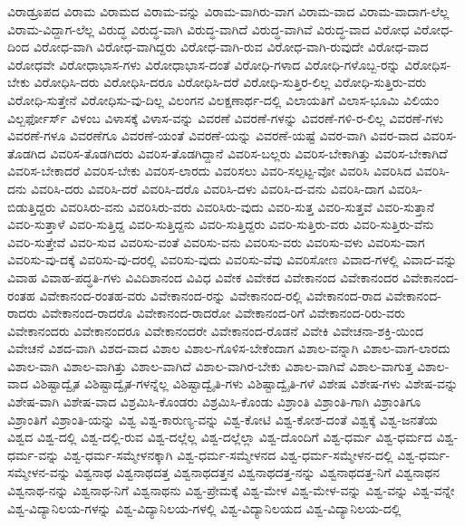 {ವಿರಾಡ್ರೂಪದ
ವಿರಾಮ
ವಿರಾಮದ
ವಿರಾಮ-ವನ್ನು
ವಿರಾಮ-ವಾಗಿರು-ವಾಗ
ವಿರಾಮ-ವಾದ
ವಿರಾಮ-ವಾದಾಗ-ಲೆಲ್ಲ
ವಿರಾಮ-ವಿದ್ದಾಗ-ಲೆಲ್ಲ
ವಿರುದ್ಧ
ವಿರುದ್ಧ-ವಾಗಿ
ವಿರುದ್ಧ-ವಾಗಿದೆ
ವಿರುದ್ಧ-ವಾಗಿವೆ
ವಿರುದ್ಧ-ವಾದ
ವಿರೋಧ
ವಿರೋಧ-ದಿಂದ
ವಿರೋಧ-ವಾಗಿ
ವಿರೋಧ-ವಾಗಿದ್ದರು
ವಿರೋಧ-ವಾಗಿ-ರುವ
ವಿರೋಧ-ವಾಗಿ-ರುವುದೇ
ವಿರೋಧ-ವಾದ
ವಿರೋಧವೇ
ವಿರೋಧಾಭಾಸ-ಗಳು
ವಿರೋಧಾಭಾಸ-ದಂತೆ
ವಿರೋಧಿ-ಗಳಾದ
ವಿರೋಧಿ-ಗಳೊಬ್ಬ-ರನ್ನು
ವಿರೋಧಿಸ-ಬೇಕು
ವಿರೋಧಿಸಿ-ದರು
ವಿರೋಧಿಸಿ-ದರೂ
ವಿರೋಧಿಸಿ-ದರೆ
ವಿರೋಧಿ-ಸುತ್ತಿರ-ಲಿಲ್ಲ
ವಿರೋಧಿ-ಸುತ್ತಿರು-ವರು
ವಿರೋಧಿ-ಸುತ್ತೇನೆ
ವಿರೋಧಿಸು-ವು-ದಿಲ್ಲ
ವಿಲಂಗನ
ವಿಲಕ್ಷಣಾರ್ಥ-ದಲ್ಲಿ
ವಿಲಾಯತಿಗೆ
ವಿಲಾಸ-ಭೂಮಿ
ವಿಲಿಯಂ
ವಿಲ್ಬರ್ಫೋರ್ಸ್
ವಿಳಂಬ
ವಿಳಾಸಕ್ಕೆ
ವಿಳಾಸ-ವನ್ನು
ವಿವರಣೆ
ವಿವರಣೆ-ಗಳನ್ನು
ವಿವರಣೆ-ಗಳಿ-ರ-ಲಿಲ್ಲ
ವಿವರಣೆ-ಗಳು
ವಿವರಣೆ-ಗಳೂ
ವಿವರಣೆಗೂ
ವಿವರಣೆ-ಯಂತೆ
ವಿವರಣೆ-ಯನ್ನು
ವಿವರಣೆ-ಯಷ್ಟೆ
ವಿವರ-ವಾಗಿ
ವಿವರ-ವಾದ
ವಿವರಿಸ-ತೊಡಗಿದ
ವಿವರಿಸ-ತೊಡಗಿದರು
ವಿವರಿಸ-ತೊಡಗಿದ್ದಾನೆ
ವಿವರಿಸ-ಬಲ್ಲರು
ವಿವರಿಸ-ಬೇಕಾಗಿತ್ತು
ವಿವರಿಸ-ಬೇಕಾಗಿದೆ
ವಿವರಿಸ-ಬೇಕಾದರೆ
ವಿವರಿಸ-ಬೇಕು
ವಿವರಿಸ-ಲಾರದು
ವಿವರಿಸಲು
ವಿವರಿ-ಸಲ್ಪಟ್ಟ-ವೋ
ವಿವರಿಸಿ
ವಿವರಿಸಿದ
ವಿವರಿಸಿ-ದನು
ವಿವರಿಸಿ-ದರು
ವಿವರಿಸಿ-ದರೆ
ವಿವರಿಸಿ-ದರೊ
ವಿವರಿಸಿ-ದಳು
ವಿವರಿಸಿ-ದ-ವನು
ವಿವರಿಸಿ-ದಾಗ
ವಿವರಿಸಿ-ಬಿಡುತ್ತಿದ್ದರು
ವಿವರಿಸಿರು-ವನು
ವಿವರಿಸಿರು-ವರು
ವಿವರಿಸಿರು-ವುದು
ವಿವರಿ-ಸುತ್ತ
ವಿವರಿ-ಸುತ್ತವೆ
ವಿವರಿ-ಸುತ್ತಾನೆ
ವಿವರಿ-ಸುತ್ತಾಳೆ
ವಿವರಿ-ಸುತ್ತಿದ್ದ
ವಿವರಿ-ಸುತ್ತಿದ್ದನು
ವಿವರಿ-ಸುತ್ತಿದ್ದರು
ವಿವರಿ-ಸುತ್ತಿರು-ವರು
ವಿವರಿ-ಸುತ್ತಿರು-ವೆನು
ವಿವರಿ-ಸುತ್ತೇವೆ
ವಿವರಿ-ಸುವ
ವಿವರಿಸು-ವಂತೆ
ವಿವರಿಸು-ವನು
ವಿವರಿಸು-ವರು
ವಿವರಿಸು-ವಳು
ವಿವರಿಸು-ವಾಗ
ವಿವರಿಸು-ವು-ದಕ್ಕೆ
ವಿವರಿಸು-ವು-ದರಲ್ಲಿ
ವಿವರಿಸು-ವುದು
ವಿವರಿಸು-ವೆವು
ವಿವರಿಸೋಣ
ವಿವಾದ-ಗಳಲ್ಲಿ
ವಿವಾದ-ವನ್ನು
ವಿವಾಹ
ವಿವಾಹ-ಪದ್ಧತಿ-ಗಳು
ವಿವಿದಿಶಾನಂದ
ವಿವಿಧ
ವಿವೇಕ
ವಿವೇಕದ
ವಿವೇಕಾನಂದ
ವಿವೇಕಾನಂದರ
ವಿವೇಕಾನಂದ-ರಂತಹ
ವಿವೇಕಾನಂದ-ರಂತಹ-ವರು
ವಿವೇಕಾನಂದ-ರನ್ನು
ವಿವೇಕಾನಂದ-ರಲ್ಲಿ
ವಿವೇಕಾನಂದ-ರಾದ
ವಿವೇಕಾನಂದ-ರಾದರು
ವಿವೇಕಾನಂದ-ರಾದರೊ
ವಿವೇಕಾನಂದ-ರಾದರೋ
ವಿವೇಕಾನಂದ-ರಿಗೆ
ವಿವೇಕಾನಂದ-ರಿರು-ವರು
ವಿವೇಕಾನಂದರು
ವಿವೇಕಾನಂದರೂ
ವಿವೇಕಾನಂದರೇ
ವಿವೇಕಾನಂದ-ರೊಡನೆ
ವಿವೇಕಿ
ವಿವೇಚನಾ-ಶಕ್ತಿ-ಯಿಂದ
ವಿವೇಚನೆ
ವಿಶದ-ವಾಗಿ
ವಿಶದ-ವಾದ
ವಿಶಾಲ
ವಿಶಾಲ-ಗೊಳಿಸ-ಬೇಕೆಂದಾಗ
ವಿಶಾಲ-ವನ್ನಾಗಿ
ವಿಶಾಲ-ವಾಗ-ಲಾರದು
ವಿಶಾಲ-ವಾಗಿ
ವಿಶಾಲ-ವಾಗಿತ್ತು
ವಿಶಾಲ-ವಾಗಿದೆ
ವಿಶಾಲ-ವಾಗಿರ-ಬೇಕು
ವಿಶಾಲ-ವಾಗಿವೆ
ವಿಶಾಲ-ವಾಗುತ್ತ
ವಿಶಾಲ-ವಾದ
ವಿಶಿಷ್ಟಾದ್ವೈತ
ವಿಶಿಷ್ಟಾದ್ವೈತ-ಗಳನ್ನೆಲ್ಲ
ವಿಶಿಷ್ಟಾದ್ವೈತಿ-ಗಳು
ವಿಶಿಷ್ಟಾದ್ವೈತಿ-ಗಳೆ
ವಿಶೇಷ
ವಿಶೇಷ-ಗಳು
ವಿಶೇಷ-ವನ್ನು
ವಿಶೇಷ-ವಾಗಿ
ವಿಶೇಷ-ವಾದ
ವಿಶ್ರಮಿಸಿ-ಕೊಂಡರು
ವಿಶ್ರಮಿಸಿ-ಕೊಂಡು
ವಿಶ್ರಾಂತಿ
ವಿಶ್ರಾಂತಿ-ಗಾಗಿ
ವಿಶ್ರಾಂತಿಗೂ
ವಿಶ್ರಾಂತಿಗೆ
ವಿಶ್ರಾಂತಿ-ಯನ್ನು
ವಿಶ್ವ
ವಿಶ್ವ-ಕಾರುಣ್ಯ-ವನ್ನು
ವಿಶ್ವ-ಕೋಟಿ
ವಿಶ್ವ-ಕೋಶ-ದಂತೆ
ವಿಶ್ವಕ್ಕೆ
ವಿಶ್ವ-ಜನತೆಯ
ವಿಶ್ವದ
ವಿಶ್ವ-ದಲ್ಲಿ
ವಿಶ್ವ-ದಲ್ಲಿ-ರುವ
ವಿಶ್ವ-ದಲ್ಲೆಲ್ಲ
ವಿಶ್ವ-ದಲ್ಲೆಲ್ಲಾ
ವಿಶ್ವ-ದೊಂದಿಗೆ
ವಿಶ್ವ-ಧರ್ಮ
ವಿಶ್ವ-ಧರ್ಮದ
ವಿಶ್ವ-ಧರ್ಮ-ವನ್ನು
ವಿಶ್ವ-ಧರ್ಮ-ಸಮ್ಮೇಳನಕ್ಕಾಗಿ
ವಿಶ್ವ-ಧರ್ಮ-ಸಮ್ಮೇಳನದ
ವಿಶ್ವ-ಧರ್ಮ-ಸಮ್ಮೇಳನ-ದಲ್ಲಿ
ವಿಶ್ವ-ಧರ್ಮ-ಸಮ್ಮೇಳನ-ವನ್ನು
ವಿಶ್ವನಾಥ
ವಿಶ್ವನಾಥದತ್ತ
ವಿಶ್ವನಾಥದತ್ತನ
ವಿಶ್ವನಾಥದತ್ತ-ನನ್ನು
ವಿಶ್ವನಾಥದತ್ತ-ನಿಗೆ
ವಿಶ್ವನಾಥನ
ವಿಶ್ವನಾಥ-ನನ್ನು
ವಿಶ್ವನಾಥ-ನಿಗೆ
ವಿಶ್ವನಾಥನು
ವಿಶ್ವ-ಪ್ರೇಮಕ್ಕೆ
ವಿಶ್ವ-ಮೇಳ
ವಿಶ್ವ-ಮೇಳ-ವನ್ನು
ವಿಶ್ವ-ವನ್ನು
ವಿಶ್ವ-ವನ್ನೇ
ವಿಶ್ವ-ವಿದ್ಯಾನಿಲಯ-ಗಳನ್ನು
ವಿಶ್ವ-ವಿದ್ಯಾನಿಲಯ-ಗಳಲ್ಲಿ
ವಿಶ್ವ-ವಿದ್ಯಾನಿಲಯದ
ವಿಶ್ವ-ವಿದ್ಯಾನಿಲಯ-ದಲ್ಲಿ
}
